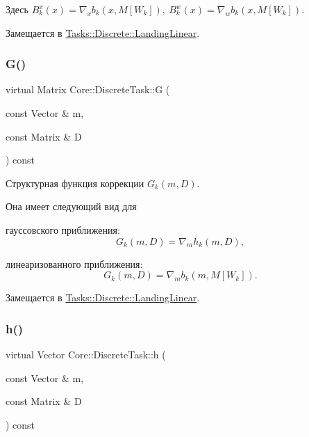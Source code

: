 Здесь $B_k^x(x) = \nabla_x b_k(x, M[W_k]),\ B_k^w(x) = \nabla_w b_k(x, M[W_k])$. 

Замещается в \hyperlink{class_tasks_1_1_discrete_1_1_landing_linear_abb4e2b054240cf909f0128721237334c}{Tasks\+::\+Discrete\+::\+Landing\+Linear}.

\hypertarget{class_core_1_1_discrete_task_a5fd0bac544a6e124ad071043a37881c3}{}\label{class_core_1_1_discrete_task_a5fd0bac544a6e124ad071043a37881c3} 
\subsubsection{\texorpdfstring{G()}{G()}}
{\footnotesize\ttfamily virtual Matrix Core\+::\+Discrete\+Task\+::G (\begin{DoxyParamCaption}\item[{const Vector \&}]{m,  }\item[{const Matrix \&}]{D }\end{DoxyParamCaption}) const\hspace{0.3cm}{\ttfamily [pure virtual]}}



Структурная функция коррекции $G_k(m, D)$. 

Она имеет следующий вид для


\begin{DoxyItemize}
\item гауссовского приближения\+: \[G_k(m, D) = \nabla_m h_k(m,D),\]
\item линеаризованного приближения\+: \[G_k(m, D) = \nabla_m b_k(m, M[W_k]).\] 
\end{DoxyItemize}

Замещается в \hyperlink{class_tasks_1_1_discrete_1_1_landing_linear_a290890c1d3a91803249a1f5d62bc658f}{Tasks\+::\+Discrete\+::\+Landing\+Linear}.

\hypertarget{class_core_1_1_discrete_task_a09eb964bfe445c1905758bfff4fc1537}{}\label{class_core_1_1_discrete_task_a09eb964bfe445c1905758bfff4fc1537} 
\subsubsection{\texorpdfstring{h()}{h()}}
{\footnotesize\ttfamily virtual Vector Core\+::\+Discrete\+Task\+::h (\begin{DoxyParamCaption}\item[{const Vector \&}]{m,  }\item[{const Matrix \&}]{D }\end{DoxyParamCaption}) const\hspace{0.3cm}{\ttfamily [pure virtual]}}



